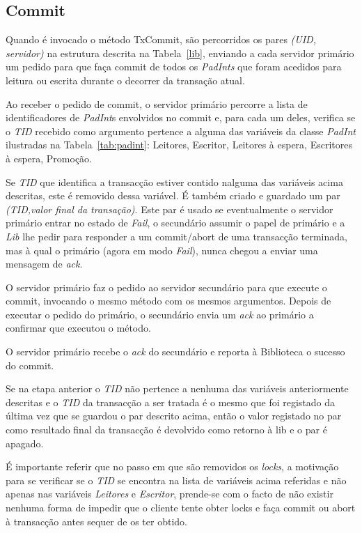 \subsection{Commit}

Quando é invocado o método TxCommit, são percorridos os pares \textit{(UID, servidor)} na estrutura descrita na Tabela~\ref{lib}, enviando a cada servidor primário um pedido para que faça commit de todos os \textit{PadInts} que foram acedidos para leitura ou escrita durante o decorrer da transação atual.

Ao receber o pedido de commit, o servidor primário percorre a lista de identificadores de \textit{PadInt}s envolvidos no commit e, para cada um deles, verifica se o \textit{TID} recebido como argumento pertence a alguma das variáveis da classe \textit{PadInt} ilustradas na Tabela~\ref{tab:padint}: Leitores, Escritor, Leitores à espera, Escritores à espera, Promoção.

Se \textit{TID} que identifica a transacção estiver contido nalguma das variáveis acima descritas, este é removido dessa variável. É também criado e guardado um par \textit{(TID,valor final da transação)}. Este par é usado se eventualmente o servidor primário entrar no estado de \textit{Fail}, o secundário assumir o papel de primário e a \textit{Lib} lhe pedir para responder a um commit/abort de uma transacção terminada, mas à qual o primário (agora em modo \textit{Fail}), nunca chegou a enviar uma mensagem de \textit{ack}.

O servidor primário faz o pedido ao servidor secundário para que execute o commit, invocando o mesmo método com os mesmos argumentos. Depois de executar o pedido do primário, o secundário envia um \textit{ack} ao primário a confirmar que executou o método.

O servidor primário recebe o \textit{ack} do secundário e reporta à Biblioteca o sucesso do commit.

Se na etapa anterior o \textit{TID} não pertence a nenhuma das variáveis anteriormente descritas e o \textit{TID} da transacção a ser tratada é o mesmo que foi registado da última vez que se guardou o par descrito acima, então o valor registado no par como resultado final da transacção é devolvido como retorno à lib e o par é apagado.

É importante referir que no passo em que são removidos os \textit{locks}, a motivação para se verificar se o \textit{TID} se encontra na lista de variáveis acima referidas e não apenas nas variáveis \textit{Leitores} e \textit{Escritor}, prende-se com o facto de não existir nenhuma forma de impedir que o cliente tente obter locks e faça commit ou abort à transacção antes sequer de os ter obtido.